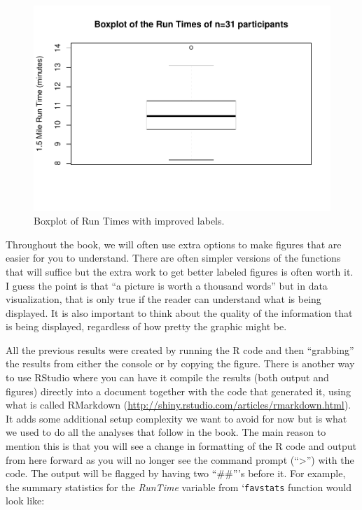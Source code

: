 \documentclass[]{book}
\begin{document}
\begin{figure}
\centering
\includegraphics{GreenwoodBanner_files/figure-latex/Figure9-1.pdf}
\caption{\label{fig:Figure9}Boxplot of Run Times with improved labels.}
\end{figure}

Throughout the book, we will often use extra options to make figures
that are easier for you to understand. There are often simpler versions
of the functions that will suffice but the extra work to get better
labeled figures is often worth it. I guess the point is that ``a picture
is worth a thousand words'' but in data visualization, that is only true
if the reader can understand what is being displayed. It is also
important to think about the quality of the information that is being
displayed, regardless of how pretty the graphic might be.

All the previous results were created by running the R code and then
``grabbing'' the results from either the console or by copying the
figure. There is another way to use RStudio where you can have it
compile the results (both output and figures) directly into a document
together with the code that generated it, using what is called RMarkdown
(\url{http://shiny.rstudio.com/articles/rmarkdown.html}). It adds some
additional setup complexity we want to avoid for now but is what we used
to do all the analyses that follow in the book. The main reason to
mention this is that you will see a change in formatting of the R code
and output from here forward as you will no longer see the command
prompt (``\textgreater{}'') with the code. The output will be flagged by
having two ``\#\#'''s before it. For example, the summary statistics for
the \emph{RunTime} variable from `\texttt{favstats} function would look
like:
\end{document}
